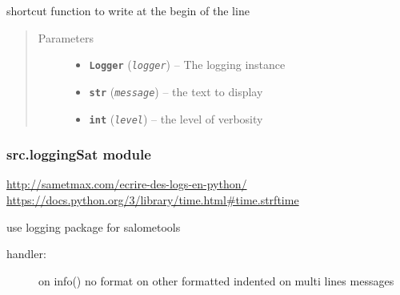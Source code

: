 \documentclass[a4paper,10pt,english]{sphinxmanual}
\begin{document}
\begin{fulllineitems}
\label{commands/apidoc/src:src.fork.write_back}
shortcut function to write at the begin of the line
\begin{quote}\begin{description}
\item[{Parameters}] \leavevmode\begin{itemize}
\item {} 
\textbf{\texttt{Logger}} (\emph{\texttt{logger}}) -- The logging instance

\item {} 
\textbf{\texttt{str}} (\emph{\texttt{message}}) -- the text to display

\item {} 
\textbf{\texttt{int}} (\emph{\texttt{level}}) -- the level of verbosity

\end{itemize}

\end{description}\end{quote}

\end{fulllineitems}



\subsubsection{src.loggingSat module}
\label{commands/apidoc/src:module-src.loggingSat}\label{commands/apidoc/src:src-loggingsat-module}
\url{http://sametmax.com/ecrire-des-logs-en-python/}
\url{https://docs.python.org/3/library/time.html\#time.strftime}

use logging package for salometools
\begin{description}
\item[{handler:}] \leavevmode
on info() no format
on other formatted indented on multi lines messages

\end{description}
\end{document}

